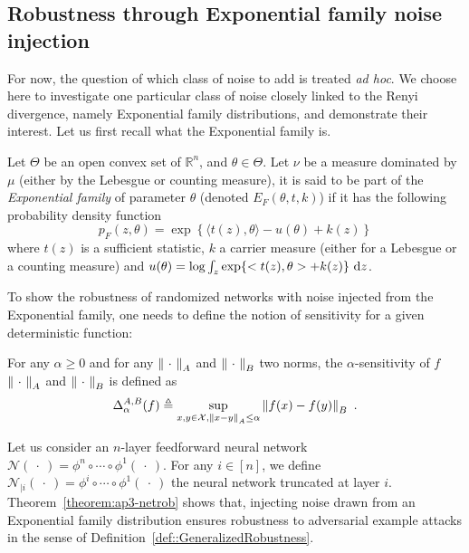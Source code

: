 \subsection{Robustness through Exponential family noise injection}

For now, the question of which class of noise to add is treated \textit{ad hoc}.
We choose here to investigate one particular class of noise closely linked to the Renyi divergence, namely Exponential family distributions, and demonstrate their interest.
Let us first recall what the Exponential family is.

\begin{definition}
  Let $\Theta$ be an open convex set of $\mathbb{R}^{n}$, and $\theta \in \Theta$.
  Let $\nu$ be a measure dominated by $\mu$ (either by the Lebesgue or counting measure), it is said to be part of the \emph{Exponential family} of parameter $\theta$ (denoted $E_{F}(\theta,t,k)$) if it has the following probability density function 
  \begin{equation}
    p_{F}(z,\theta)=\exp\left\{ \langle t(z),\theta \rangle -u(\theta) +k(z) \right\}
  \end{equation}
  where $t(z)$ is a sufficient statistic, $k$ a carrier measure (either for a Lebesgue or a counting measure) and $u(\theta) = \log \int_{z} \exp\left\{ <t(z),\theta> +k(z) \right\} \,\diff z $.
\end{definition}

\noindent
To show the robustness of randomized networks with noise injected from the Exponential family, one needs to define the notion of sensitivity for a given deterministic function:
\begin{definition}
  For any $\alpha\geq0$ and for any $\norm{\ \cdot\ }_A$ and $\norm{\ \cdot\ }_B$ two norms, the $\alpha$-sensitivity of $f$ \wrt $\norm{\ \cdot\ }_A$ and $\norm{\ \cdot\ }_B$ is defined as
  \begin{equation}
    \Delta^{A,B}_\alpha(f) \triangleq \sup\limits_{ x,y \in \mathcal{X}, \norm{x-y}_{A} \leq \alpha} \norm{f(x) - f(y)}_B \enspace.
  \end{equation}
  \removespace
\end{definition}

\noindent
Let us consider an  $n$-layer feedforward neural network  $\mathcal{N}(\ \cdot\ ) = \phi^n \circ \cdots \circ \phi^1(\ \cdot\ )$.
For any $i\in\left[n\right]$, we define $\mathcal{N}_{|i}(\ \cdot\ ) = \phi^i\circ \cdots \circ \phi^1(\ \cdot\ )$ the neural network truncated at layer $i$.
Theorem~\ref{theorem:ap3-netrob} shows that, injecting noise drawn from an Exponential family distribution ensures robustness to adversarial example attacks in the sense of Definition~\ref{def::GeneralizedRobustness}.


